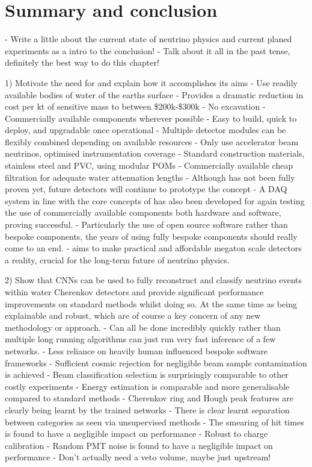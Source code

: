 \chapter{Summary and conclusion} %
\label{chap:conclusion} %

- Write a little about the current state of neutrino physics and current planed experiments as a
intro to the conclusion!
- Talk about it all in the past tense, definitely the best way to do this chapter!

1) Motivate the need for \chips and explain how it accomplishes its aims
    - Use readily available bodies of water of the earths surface
    - Provides a dramatic reduction in cost per kt of sensitive mass to between \$200k-\$300k
    - No excavation
    - Commercially available components wherever possible
    - Easy to build, quick to deploy, and upgradable once operational
    - Multiple detector modules can be flexibly combined depending on available resources
    - Only use accelerator beam neutrinos, optimised instrumentation coverage
    - Standard construction materials, stainless steel and PVC, using modular POMs
    - Commercially available cheap filtration for adequate water attenuation lengths
    - Although \chipsfive has not been fully proven yet, future \chips detectors will continue to
    prototype the concept
    - A DAQ system in line with the core concepts of \chips has also been developed for \chipsfive
    again testing the use of commercially available components both hardware and software, proving
    successful. 
    - Particularly the use of open source software rather than bespoke components, the years of
    using fully bespoke components should really come to an end.
    - \chips aims to make practical and affordable megaton scale detectors a
    reality, crucial for the long-term future of neutrino physics.

2) Show that CNNs can be used to fully reconstruct and classify neutrino events within water
Cherenkov detectors and provide significant performance improvements on standard methods whilst
doing so. At the same time as being explainable and robust, which are of course a key concern of
any new methodology or approach. 
    - Can all be done incredibly quickly rather than multiple long running algorithms can just run
    very fast inference of a few networks.
    - Less reliance on heavily human influenced bespoke software frameworks
    - Sufficient cosmic rejection for negligible beam sample contamination is achieved
    - Beam classification selection is surprisingly comparable to other costly experiments
    - Energy estimation is comparable and more generalisable compared to standard methods
    - Cherenkov ring and Hough peak features are clearly being learnt by the trained networks
    - There is clear learnt separation between categories as seen via unsupervised methods
    - The smearing of hit times is found to have a negligible impact on performance
    - Robust to charge calibration
    - Random PMT noise is found to have a negligible impact on performance
    - Don't actually need a veto volume, maybe just upstream!

